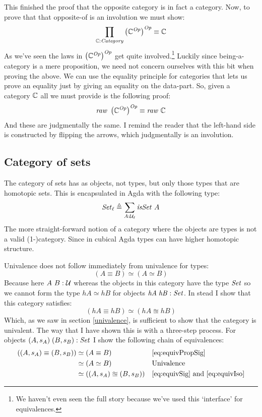 This finished the proof that the opposite category is in fact a category. Now,
to prove that that opposite-of is an involution we must show:
%
$$
\prod_{\mathbb{C} \mathrel{:} \mathit{Category}} \left(\mathbb{C}^{\mathit{Op}}\right)^{\mathit{Op}} \equiv \mathbb{C}
$$
%
As we've seen the laws in $\left(\mathbb{C}^{\mathit{Op}}\right)^{\mathit{Op}}$ get
quite involved.\footnote{We haven't even seen the full story because we've used
  this `interface' for equivalences.} Luckily since being-a-category is a mere
proposition, we need not concern ourselves with this bit when proving the above.
We can use the equality principle for categories that lets us prove an equality
just by giving an equality on the data-part. So, given a category $\mathbb{C}$ all we
must provide is the following proof:
%
$$
\mathit{raw}\ \left(\bC^{\mathit{Op}}\right)^{\mathit{Op}} \equiv \mathit{raw}\ \bC
$$
%
And these are judgmentally the same. I remind the reader that the left-hand side
is constructed by flipping the arrows, which judgmentally is an involution.

\subsection{Category of sets}
The category of sets has as objects, not types, but only those types that are
homotopic sets. This is encapsulated in Agda with the following type:
%
$$\mathit{Set}_\ell \mathrel{\triangleq} \sum_{A \mathrel{:} \mathcal{U}_\ell} \mathit{isSet}\ A$$
%
The more straight-forward notion of a category where the objects are types is
not a valid (1-)category. Since in cubical Agda types can have higher homotopic
structure.

Univalence does not follow immediately from univalence for types:
%
$$(A \equiv B) \simeq (A \simeq B)$$
%
Because here $A\ B \mathrel{:} \mathcal{U}$ whereas the objects in this category have the type
$\mathit{Set}$ so we cannot form the type $\mathit{hA} \simeq \mathit{hB}$ for objects
$\mathit{hA}\;\mathit{hB} \mathrel{:} \mathit{Set}$. In stead I show that this category
satisfies:
%
$$
(\mathit{hA} \equiv \mathit{hB}) \simeq (\mathit{hA} \approxeq \mathit{hB})
$$
%
Which, as we saw in section \ref{univalence}, is sufficient to show that the
category is univalent. The way that I have shown this is with a three-step
process. For objects $(A, s_A)\; (B, s_B) \mathrel{:} \mathit{Set}$ I show the following chain
of equivalences:
%
\begin{align*}
((A, s_A) \equiv (B, s_B))
 & \simeq (A \equiv B) && \ref{eq:equivPropSig} \\
 & \simeq (A \simeq B) && \text{Univalence} \\
 & \simeq ((A, s_A) \approxeq (B, s_B)) && \text{\ref{eq:equivSig} and \ref{eq:equivIso}}
\end{align*}

